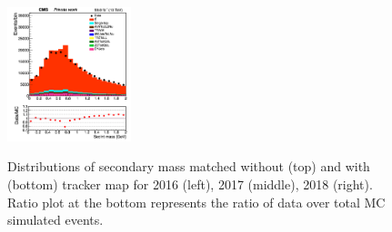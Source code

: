 \documentclass{cernatlasnote}
\begin{document}
\begin{figure}[htp]
 \includegraphics[width=0.32\textwidth]{images/emu_channel/2018/18_Range_0pt7_1pt3/SecInt_mass_TrackerMatched_Linear.png}\\
 \caption{Distributions of secondary mass matched without (top) and with (bottom) tracker map for 2016 (left), 2017 (middle), 2018 (right). Ratio plot at the bottom represents the ratio of data over total MC simulated events.}
 \label{fig:L0DATAMC}
  \end{figure}
\end{document}
